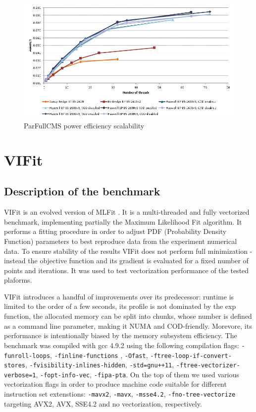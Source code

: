 \documentclass[a4paper]{jpconf}
\begin{document}
\begin{figure}[ht!]
\centering
  \includegraphics[width=\textwidth]{parfullcms_power}
  \caption{ParFullCMS power efficiency scalability}
  \label{fig:parfullcms_power_scalability}
\end{figure}


\section{VIFit}

\subsection{Description of the benchmark}
VIFit is an evolved version of MLFit \cite{mlfit}. It is a multi-threaded and fully vectorized benchmark, implementing partially the Maximum Likelihood Fit algorithm. It performs a fitting procedure in order to adjust PDF (Probability Density Function) parameters to best reproduce data from the experiment numerical data. To ensure stability of the results VIFit does not perform full minimization - instead the objective function and its gradient is evaluated for a fixed number of points and iterations. It was used to test vectorization performance of the tested plaforms.

VIFit introduces a handful of improvements over its predecessor: runtime is limited to the order of a few seconds, its profile is not dominated by the exp function, the allocated memory can be split into chunks, whose number is defined as a command line parameter, making it NUMA and COD-friendly. Morevore, its performance is intentionally biased by the memory subsystem efficiency.
The benchmark was compiled with gcc 4.9.2 using the following compilation flags: \verb|-funroll-loops|, \verb|-finline-functions| , \verb|-Ofast|, \verb|-ftree-loop-if-convert-stores|, \verb|-fvisibility-inlines-hidden|, \verb|-std=gnu++11|, \verb|-ftree-vectorizer-verbose=1|, \verb|-fopt-info-vec|, \verb|-fipa-pta|. On the top of them we used various vectorization flags in order to produce machine code suitable for different instruction set extenstions: \verb!-mavx2!, \verb!-mavx!, \verb!-msse4.2!, \verb!-fno-tree-vectorize! targeting AVX2, AVX, SSE4.2 and no vectorization, respectively.
\end{document}
